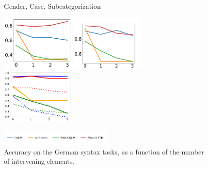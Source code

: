 
\begin{figure}
Gender, Case, Subcategorization

\includegraphics[width=0.33\textwidth]{figures/german-gender-total.pdf}
\includegraphics[width=0.33\textwidth]{figures/german-case-total.pdf}
\includegraphics[width=0.33\textwidth]{figures/german-prep-with-control.pdf}

\centering\includegraphics[width=0.5\textwidth]{figures/german-legend.pdf}
\caption{Accuracy on the German syntax tasks, as a function of the number of intervening elements.}\label{fig:german-syntax}
\end{figure}


